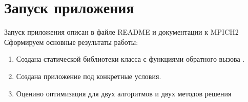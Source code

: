 \section{Запуск приложения}
Запуск приложения описан в файле README и документации к MPICH2 
\newpage{}
 Сформируем основные результаты работы:
 \begin{enumerate}
	\item Создана статической библиотеки класса с функциями обратного вызова .
	\item Создана приложение под конкретные условия.
	\item Оценино оптимизация для двух алгоритмов и двух методов решения
\end{enumerate}
